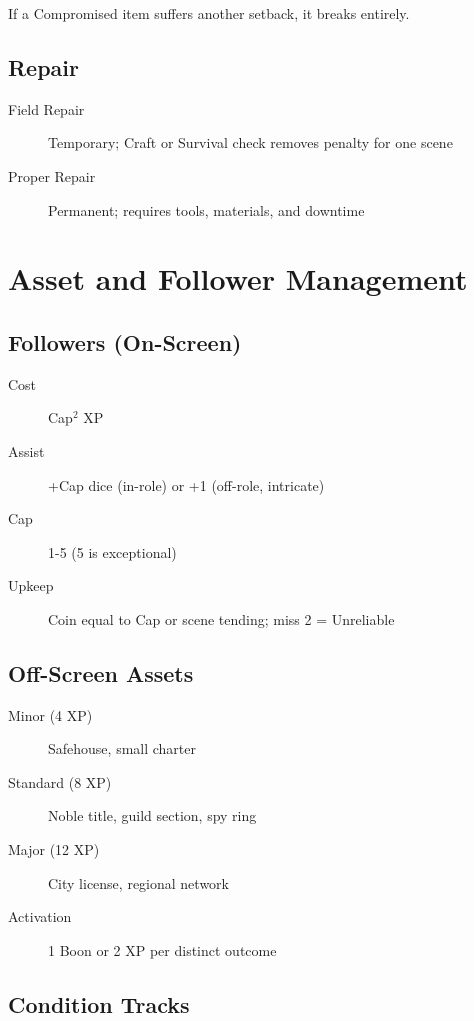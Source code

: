 If a Compromised item suffers another setback, it breaks entirely.

\subsection{Repair}

\begin{description}
\item[Field Repair] Temporary; Craft or Survival check removes penalty for one scene
\item[Proper Repair] Permanent; requires tools, materials, and downtime
\end{description}

\section{Asset and Follower Management}

\subsection{Followers (On-Screen)}

\begin{description}
\item[Cost] Cap$^2$ XP
\item[Assist] +Cap dice (in-role) or +1 (off-role, intricate)
\item[Cap] 1-5 (5 is exceptional)
\item[Upkeep] Coin equal to Cap or scene tending; miss 2 = Unreliable
\end{description}

\subsection{Off-Screen Assets}

\begin{description}
\item[Minor (4 XP)] Safehouse, small charter
\item[Standard (8 XP)] Noble title, guild section, spy ring
\item[Major (12 XP)] City license, regional network
\item[Activation] 1 Boon or 2 XP per distinct outcome
\end{description}

\subsection{Condition Tracks}

